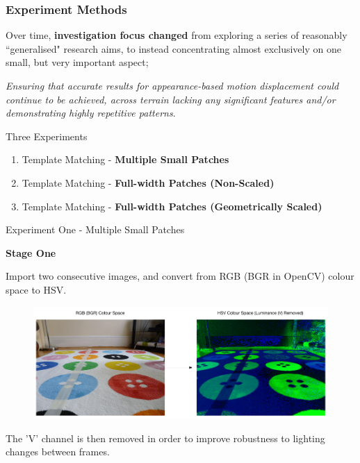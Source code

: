 \documentclass[10pt, compress]{beamer}
\begin{document}
\begin{frame}[fragile]
  \frametitle{Experiment Methods}
  
  {\normalsize Over time, \textbf{investigation focus changed} from exploring a series of reasonably ``generalised" research aims, to instead concentrating almost exclusively on one small, but very important aspect; 
  \vspace{-10pt}
  
  \begin{block}{}
  \textit{Ensuring that accurate results for appearance-based motion displacement could continue to be achieved, across terrain lacking any significant features and/or demonstrating highly repetitive patterns}.
  \end{block}}
		
  \begin{block}{Three Experiments}
  \begin{enumerate}[label={\arabic*.}]
  	  
  \item Template Matching - \textbf{Multiple Small Patches}

  \item Template Matching - \textbf{Full-width Patches (Non-Scaled)}
  
  \item Template Matching - \textbf{Full-width Patches (Geometrically Scaled)}
 
\end{enumerate}
\end{block}

\end{frame}

\begin{frame}{Experiment One - Multiple Small Patches}


\textbf{Stage One} \\ \vspace{0.2cm}

Import two consecutive images, and convert from RGB (BGR in OpenCV) colour space to HSV.

\begin{figure}[ht!]
\centering
\includegraphics[scale=0.26]{rgb2hsv.png}
  \end{figure}
  
The 'V' channel is then removed in order to improve robustness to lighting changes between frames. 
\end{frame}
\end{document}

